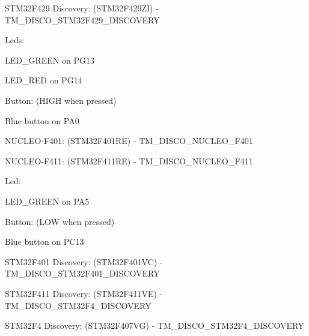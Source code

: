 \begin{DoxyItemize}
\item S\+T\+M32\+F429 Discovery\+: (S\+T\+M32\+F429\+Z\+I) -\/ {\ttfamily T\+M\+\_\+\+D\+I\+S\+C\+O\+\_\+\+S\+T\+M32\+F429\+\_\+\+D\+I\+S\+C\+O\+V\+E\+R\+Y}
\begin{DoxyItemize}
\item Leds\+:
\begin{DoxyItemize}
\item L\+E\+D\+\_\+\+G\+R\+E\+E\+N on P\+G13
\item L\+E\+D\+\_\+\+R\+E\+D on P\+G14
\end{DoxyItemize}
\item Button\+: (H\+I\+G\+H when pressed)
\begin{DoxyItemize}
\item Blue button on P\+A0
\end{DoxyItemize}
\end{DoxyItemize}
\item N\+U\+C\+L\+E\+O-\/\+F401\+: (S\+T\+M32\+F401\+R\+E) -\/ {\ttfamily T\+M\+\_\+\+D\+I\+S\+C\+O\+\_\+\+N\+U\+C\+L\+E\+O\+\_\+\+F401}
\item N\+U\+C\+L\+E\+O-\/\+F411\+: (S\+T\+M32\+F411\+R\+E) -\/ {\ttfamily T\+M\+\_\+\+D\+I\+S\+C\+O\+\_\+\+N\+U\+C\+L\+E\+O\+\_\+\+F411}
\begin{DoxyItemize}
\item Led\+:
\begin{DoxyItemize}
\item L\+E\+D\+\_\+\+G\+R\+E\+E\+N on P\+A5
\end{DoxyItemize}
\item Button\+: (L\+O\+W when pressed)
\begin{DoxyItemize}
\item Blue button on P\+C13
\end{DoxyItemize}
\end{DoxyItemize}
\item S\+T\+M32\+F401 Discovery\+: (S\+T\+M32\+F401\+V\+C) -\/ {\ttfamily T\+M\+\_\+\+D\+I\+S\+C\+O\+\_\+\+S\+T\+M32\+F401\+\_\+\+D\+I\+S\+C\+O\+V\+E\+R\+Y}
\item S\+T\+M32\+F411 Discovery\+: (S\+T\+M32\+F411\+V\+E) -\/ {\ttfamily T\+M\+\_\+\+D\+I\+S\+C\+O\+\_\+\+S\+T\+M32\+F4\+\_\+\+D\+I\+S\+C\+O\+V\+E\+R\+Y}
\item S\+T\+M32\+F4 Discovery\+: (S\+T\+M32\+F407\+V\+G) -\/ {\ttfamily T\+M\+\_\+\+D\+I\+S\+C\+O\+\_\+\+S\+T\+M32\+F4\+\_\+\+D\+I\+S\+C\+O\+V\+E\+R\+Y}
\begin{DoxyItemize}

\end{DoxyItemize}
\end{DoxyItemize}
